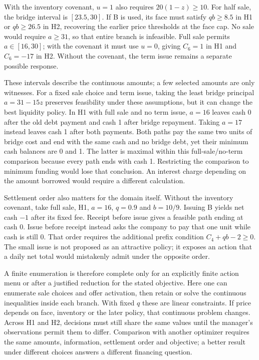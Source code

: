 With the inventory covenant, $u=1$ also requires $20(1-z)\geq10$.
For half sale, the bridge interval is $[23.5,30]$. If B is used, its face must
satisfy $qb\geq8.5$ in H1 or $qb\geq26.5$ in H2, recovering the earlier price
thresholds at the face cap. No sale would require $a\geq31$, so that entire
branch is infeasible. Full sale permits $a\in[16,30]$; with the covenant it
must use $u=0$, giving $C_6=1$ in H1 and $C_6=-17$ in H2. Without the covenant,
the term issue remains a separate possible response.

These intervals describe the continuous amounts; a few selected amounts are
only witnesses. For a fixed sale choice and term issue, taking the least
bridge principal $a=31-15z$ preserves feasibility under these assumptions, but
it can change the best liquidity policy. In H1 with full sale and no term issue,
$a=16$ leaves cash 0 after the old debt payment and cash 1 after bridge
repayment. Taking $a=17$ instead leaves cash 1 after both payments. Both paths
pay the same two units of bridge cost and end with the same cash and no bridge
debt, yet their minimum cash balances are 0 and 1. The latter is maximal within
this full-sale/no-term comparison because every path ends with cash 1. Restricting
the comparison to minimum funding would lose that conclusion. An interest
charge depending on the amount borrowed would require a different calculation.

Settlement order also matters for the domain itself. Without the inventory
covenant, take full sale, H1,
$a=16$, $q=0.9$ and $b=10/9$. Issuing B yields net cash $-1$ after its fixed
fee. Receipt before issue gives a feasible path ending at cash 0. Issue before
receipt instead asks the company to pay that one unit while cash is still 0.
That order requires the additional prefix condition $C_4+qb-2\geq0$.
The small issue is not proposed as an attractive policy; it exposes an action
that a daily net total would mistakenly admit under the opposite order.

A finite enumeration is therefore complete only for an explicitly finite
action menu or after a justified reduction for the stated objective. Here one
can enumerate sale choices and offer activation, then retain or solve the
continuous inequalities inside each branch. With fixed $q$ these are linear
constraints. If price depends on face, inventory or the later policy, that
continuous problem changes. Across H1 and H2, decisions must still share the
same values until the manager's observations permit them to differ. Comparison
with another optimizer requires the same amounts, information, settlement
order and objective; a better result under different choices answers a
different financing question.
